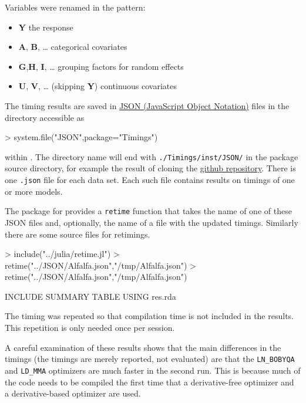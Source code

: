 \documentclass[article]{jss}
\begin{document}
Variables were renamed in the pattern: 

\begin{itemize}
\item \textbf{Y} the response 
\item \textbf{A}, \textbf{B}, \dots{} categorical covariates 
\item \textbf{G},\textbf{H}, \textbf{I}, \dots{} grouping factors for random effects 
\item \textbf{U}, \textbf{V}, \dots{} (skipping \textbf{Y}) continuous covariates
\end{itemize}


The timing results are saved in \href{http://json.org}{JSON (JavaScript
Object Notation)} files in the directory accessible as

\begin{Schunk}
\begin{Sinput}
> system.file("JSON",package="Timings")
\end{Sinput}
\end{Schunk}

within . The directory name will end with
\texttt{./Timings/inst/JSON/} in the package source directory, for
example the result of cloning the
\href{https://github.com/Stat990-033/Timings}{github repository}. There
is one \texttt{.json} file for each data set. Each such file contains
results on timings of one or more models.

The  package for  provides a \texttt{retime}
function that takes the name of one of these JSON files and, optionally,
the name of a file with the updated timings. Similarly there are some
source files for  retimings.

\begin{Schunk}
\begin{Sinput}
> include("../julia/retime.jl")
> retime("../JSON/Alfalfa.json","/tmp/Alfalfa.json")
> retime("../JSON/Alfalfa.json","/tmp/Alfalfa.json")
\end{Sinput}
\end{Schunk}


INCLUDE SUMMARY TABLE USING res.rda

  The timing was repeated so that compilation time is not included in the
results. This repetition is only needed once per session.

A careful examination of these results shows that the main differences
in the  timings (the  timings are merely reported, not evaluated)
are that the \texttt{LN\_BOBYQA} and \texttt{LD\_MMA} optimizers are
much faster in the second run. This is because much of the code needs to
be compiled the first time that a derivative-free optimizer and a
derivative-based optimizer are used.
\end{document}
